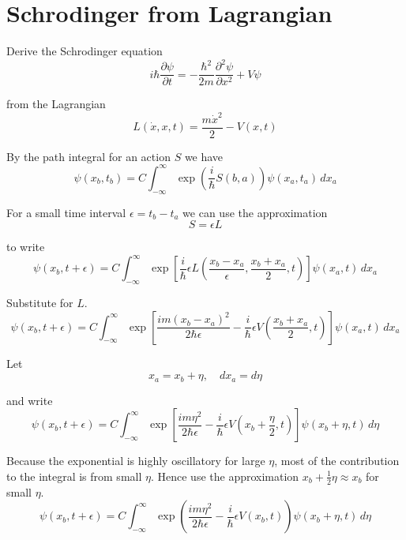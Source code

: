 

\section*{Schrodinger from Lagrangian}

Derive the Schrodinger equation
\begin{equation*}
i\hbar\frac{\partial\psi}{\partial t}=-\frac{\hbar^2}{2m}\frac{\partial^2\psi}{\partial x^2}+V\psi
\end{equation*}

from the Lagrangian
\begin{equation*}
L(\dot x,x,t)=\frac{m\dot x^2}{2}-V(x,t)
\end{equation*}

By the path integral for an action $S$ we have
\begin{equation*}
\psi(x_b,t_b)=C\int_{-\infty}^\infty\exp\left(\frac{i}{\hbar}S(b,a)\right)\psi(x_a,t_a)\,dx_a
\end{equation*}

For a small time interval $\epsilon=t_b-t_a$ we can use the approximation
\begin{equation*}
S=\epsilon L
\end{equation*}

to write
\begin{equation*}
\psi(x_b,t+\epsilon)=C\int_{-\infty}^\infty
\exp\left[\frac{i}{\hbar}\epsilon L\left(\frac{x_b-x_a}{\epsilon},\frac{x_b+x_a}{2},t\right)\right]
\psi(x_a,t)\,dx_a
\end{equation*}

Substitute for $L$.
\begin{equation*}
\psi(x_b,t+\epsilon)=C\int_{-\infty}^\infty
\exp\left[\frac{im(x_b-x_a)^2}{2\hbar\epsilon}
-\frac{i}{\hbar}\epsilon V\left(\frac{x_b+x_a}{2},t\right)\right]\psi(x_a,t)\,dx_a
\end{equation*}

Let
\begin{equation*}
x_a=x_b+\eta,\quad dx_a=d\eta
\end{equation*}

and write
\begin{equation*}
\psi(x_b,t+\epsilon)=C\int_{-\infty}^\infty
\exp\left[\frac{im\eta^2}{2\hbar\epsilon}
-\frac{i}{\hbar}\epsilon V\left(x_b+\frac{\eta}{2},t\right)\right]\psi(x_b+\eta,t)\,d\eta
\end{equation*}

Because the exponential is highly oscillatory for large $\eta$,
most of the contribution to the integral is from small $\eta$.
Hence use the approximation $x_b+\tfrac{1}{2}\eta\approx x_b$ for small $\eta$.
\begin{equation*}
\psi(x_b,t+\epsilon)=C\int_{-\infty}^\infty
\exp\left(\frac{im\eta^2}{2\hbar\epsilon}
-\frac{i}{\hbar}\epsilon V(x_b,t)\right)\psi(x_b+\eta,t)\,d\eta
\end{equation*}


